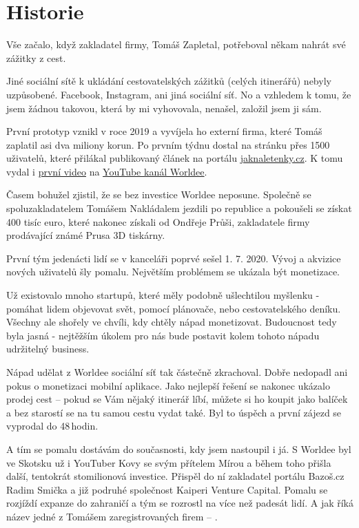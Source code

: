 \section{Historie}

Vše začalo, když zakladatel firmy, Tomáš Zapletal, potřeboval někam nahrát své zážitky z cest.

\begin{displayquote}
Jiné sociální sítě k ukládání cestovatelských zážitků (celých itinerářů) nebyly uzpůsobené. Facebook, Instagram, ani jiná sociální síť. No a vzhledem k tomu, že jsem žádnou takovou, která by mi vyhovovala, nenašel, založil jsem ji sám.
\end{displayquote}

První prototyp vznikl v roce 2019 a vyvíjela ho externí firma, které Tomáš zaplatil asi dva miliony korun. Po prvním týdnu dostal na stránku přes 1500 uživatelů, které přilákal publikovaný článek na portálu \href{https://jaknaletenky.cz/cesky-startup-worldee-miri-do-sveta-a-potrebuje-vasi-pomoc.html}{jaknaletenky.cz}. K tomu vydal i \href{https://youtu.be/wJCV-5x0aIk}{první video} na \href{https://www.youtube.com/@worldee8910}{YouTube kanál Worldee}.

Časem bohužel zjistil, že se bez investice Worldee neposune. Společně se spoluzakladatelem Tomášem Nakládalem jezdili po republice a pokoušeli se získat 400 tisíc euro, které nakonec získali od Ondřeje Průši, zakladatele firmy prodávající známé Prusa 3D tiskárny.

První tým jedenácti lidí se v kanceláři poprvé sešel 1. 7. 2020. Vývoj a akvizice nových uživatelů šly pomalu. Největším problémem se ukázala být monetizace.

\begin{displayquote}
Už existovalo mnoho startupů, které měly podobně ušlechtilou myšlenku - pomáhat lidem objevovat svět, pomocí plánovače, nebo cestovatelského deníku. Všechny ale shořely ve chvíli, kdy chtěly nápad monetizovat. Budoucnost tedy byla jasná - nejtěžším úkolem pro nás bude postavit kolem tohoto nápadu udržitelný business.
\end{displayquote}

Nápad udělat z Worldee sociální síť tak částečně zkrachoval. Dobře nedopadl ani pokus o monetizaci mobilní aplikace. Jako nejlepší řešení se nakonec ukázalo prodej cest – pokud se Vám nějaký itinerář líbí, můžete si ho koupit jako balíček a bez starostí se na tu samou cestu vydat také. Byl to úspěch a první zájezd se vyprodal do 48\,hodin.

A tím se pomalu dostávám do současnosti, kdy jsem nastoupil i já. S Worldee byl ve Skotsku už i YouTuber Kovy se svým přítelem Mírou\cite{WorldeeKovy} a během toho přišla další, tentokrát stomilionová investice.\cite{WorldeeInvestice} Přispěl do ní zakladatel portálu Bazoš.cz Radim Smička a již podruhé společnost Kaiperi Venture Capital. Pomalu se rozjíždí expanze do zahraničí a tým se rozrostl na více než padesát lidí. A jak říká název jedné z Tomášem zaregistrovaných firem – .\cite{Podnikani}
